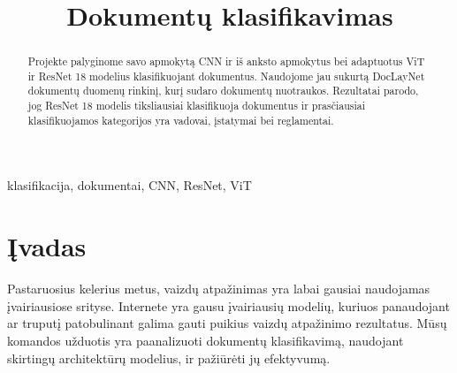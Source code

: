 \documentclass[conference]{IEEEtran}
\begin{document}
\title{Dokumentų klasifikavimas}

\author{
\and
{}
\and
{}
}

\maketitle

\begin{abstract}
    Projekte palyginome savo apmokytą CNN ir iš anksto apmokytus bei adaptuotus ViT ir ResNet 18 modelius klasifikuojant dokumentus. Naudojome jau sukurtą DocLayNet dokumentų duomenų rinkinį, kurį sudaro dokumentų nuotraukos. Rezultatai parodo, jog ResNet 18 modelis tiksliausiai klasifikuoja dokumentus ir prasčiausiai klasifikuojamos kategorijos yra vadovai, įstatymai bei reglamentai.
\end{abstract}

\begin{IEEEkeywords}
    klasifikacija, dokumentai, CNN, ResNet, ViT
\end{IEEEkeywords}

\section{Įvadas}
Pastaruosius kelerius metus, vaizdų atpažinimas yra labai gausiai naudojamas įvairiausiose srityse. Internete yra gausu įvairiausių modelių, kuriuos panaudojant ar truputį patobulinant galima gauti puikius vaizdų atpažinimo rezultatus. Mūsų komandos užduotis yra paanalizuoti dokumentų klasifikavimą, naudojant skirtingų architektūrų modelius, ir pažiūrėti jų efektyvumą.
\end{document}
